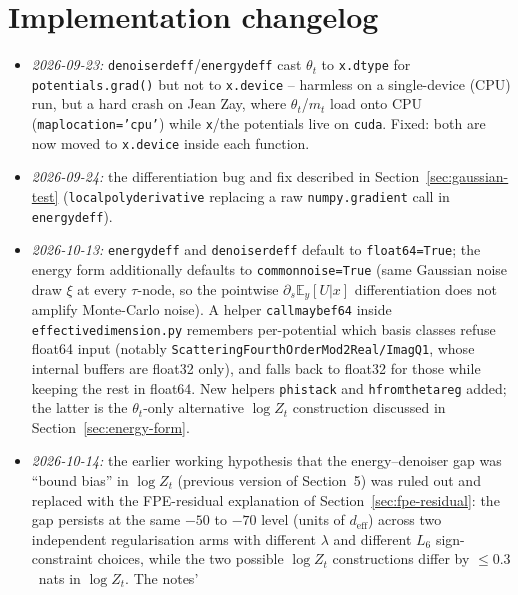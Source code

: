 \documentclass[11pt]{article}
\newcommand{\E}{\mathbb{E}}
\newcommand{\code}[1]{\texttt{#1}}
\renewcommand{\_}{\origunderscore\allowbreak}
\newcommand{\deff}{d_{\mathrm{eff}}}
\begin{document}
\section*{Implementation changelog}

\begin{itemize}
  \item \emph{2026-09-23:} \code{denoiser\_d\_eff}/\code{energy\_d\_eff} cast
        $\theta_t$ to \code{x.dtype} for \code{potentials.grad()} but not to
        \code{x.device} -- harmless on a single-device (CPU) run, but a hard
        crash on Jean Zay, where $\theta_t$/$m_t$ load onto CPU
        (\code{map\_location='cpu'}) while \code{x}/the potentials live on
        \code{cuda}. Fixed: both are now moved to \code{x.device} inside
        each function.
  \item \emph{2026-09-24:} the differentiation bug and fix described in
        Section~\ref{sec:gaussian-test} (\code{local\_poly\_derivative}
        replacing a raw \code{numpy.gradient} call in
        \code{energy\_d\_eff}).
  \item \emph{2026-10-13:} \code{energy\_d\_eff} and
        \code{denoiser\_d\_eff} default to \code{float64=True}; the energy
        form additionally defaults to \code{common\_noise=True} (same
        Gaussian noise draw $\xi$ at every $\tau$-node, so the pointwise
        $\partial_s \E_y[U|x]$ differentiation does not amplify Monte-Carlo
        noise). A helper \code{\_call\_maybe\_f64} inside
        \code{effective\_dimension.py} remembers per-potential which basis
        classes refuse float64 input (notably
        \code{Scattering\_Fourth\_Order\_Mod2\_Real/Imag\_Q1}, whose
        internal buffers are float32 only), and falls back to float32 for
        those while keeping the rest in float64. New helpers
        \code{phi\_stack} and \code{h\_from\_theta\_reg} added; the latter
        is the $\theta_t$-only alternative $\log Z_t$ construction
        discussed in Section~\ref{sec:energy-form}.
  \item \emph{2026-10-14:} the earlier working hypothesis that the
        energy--denoiser gap was ``bound bias'' in $\log Z_t$ (previous
        version of Section~5) was ruled out and replaced with the
        FPE-residual explanation of Section~\ref{sec:fpe-residual}: the
        gap persists at the same $-50$ to $-70$ level (units of $\deff$) across two
        independent regularisation arms with different $\lambda$ and
        different $L_6$ sign-constraint choices, while the two possible
        $\log Z_t$ constructions differ by $\leq 0.3$~nats in $\log Z_t$. The notes'

\end{itemize}
\end{document}
